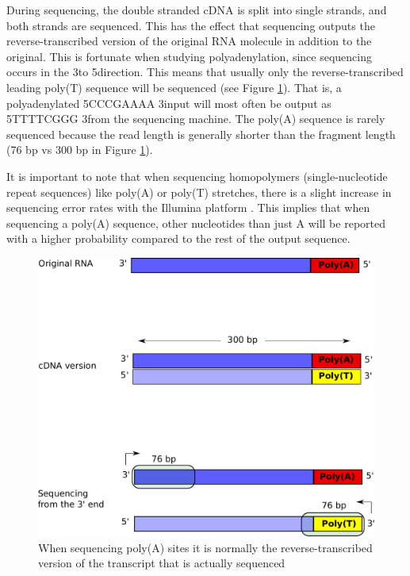 During sequencing, the double stranded cDNA is split into single strands, and
both strands are sequenced. This has the effect that sequencing outputs the
reverse-transcribed version of the original RNA molecule in addition to the
original. This is fortunate when studying polyadenylation, since sequencing
occurs in the 3\ppp to 5\ppp direction. This means that usually only the
reverse-transcribed leading poly(T) sequence will be sequenced (see Figure
\ref{fig:polyT_seq}). That is, a polyadenylated 5\ppp CCCGAAAA 3\ppp input will
most often be output as 5\ppp TTTTCGGG 3\ppp from the sequencing machine. The
poly(A) sequence is rarely sequenced because the read length is generally
shorter than the fragment length (76 bp vs 300 bp in Figure
\ref{fig:polyT_seq}).

It is important to note that when sequencing homopolymers (single-nucleotide
repeat sequences) like poly(A) or poly(T) stretches, there is a slight increase
in sequencing error rates with the Illumina platform
\cite{minoche_evaluation_2011}. This implies that when sequencing a poly(A)
sequence, other nucleotides than just A will be reported with a higher
probability compared to the rest of the output sequence.

\begin{figure}[htb]
	\begin{center}
		\includegraphics[scale=0.4]{figures/introduction/polyT_sequencing.pdf}
	\end{center}
	\caption{When sequencing poly(A) sites it is normally the
	reverse-transcribed version of the transcript that is actually sequenced}
	\label{fig:polyT_seq}
\end{figure}

